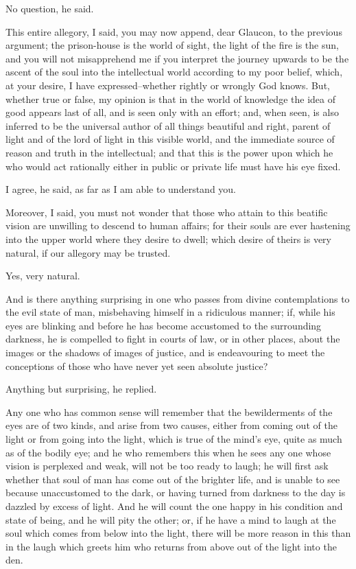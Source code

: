 No question, he said.

This entire allegory, I said, you may now append, dear Glaucon, to the
previous argument; the prison-house is the world of sight, the light of
the fire is the sun, and you will not misapprehend me if you interpret
the journey upwards to be the ascent of the soul into the intellectual
world according to my poor belief, which, at your desire, I have
expressed--whether rightly or wrongly God knows. But, whether true or
false, my opinion is that in the world of knowledge the idea of good
appears last of all, and is seen only with an effort; and, when seen,
is also inferred to be the universal author of all things beautiful and
right, parent of light and of the lord of light in this visible world,
and the immediate source of reason and truth in the intellectual; and
that this is the power upon which he who would act rationally either in
public or private life must have his eye fixed.

I agree, he said, as far as I am able to understand you.

Moreover, I said, you must not wonder that those who attain to this
beatific vision are unwilling to descend to human affairs; for their
souls are ever hastening into the upper world where they desire to
dwell; which desire of theirs is very natural, if our allegory may be
trusted.

Yes, very natural.

And is there anything surprising in one who passes from divine
contemplations to the evil state of man, misbehaving himself in a
ridiculous manner; if, while his eyes are blinking and before he has
become accustomed to the surrounding darkness, he is compelled to fight
in courts of law, or in other places, about the images or the shadows of
images of justice, and is endeavouring to meet the conceptions of those
who have never yet seen absolute justice?

Anything but surprising, he replied.

Any one who has common sense will remember that the bewilderments of the
eyes are of two kinds, and arise from two causes, either from coming out
of the light or from going into the light, which is true of the mind's
eye, quite as much as of the bodily eye; and he who remembers this when
he sees any one whose vision is perplexed and weak, will not be too
ready to laugh; he will first ask whether that soul of man has come out
of the brighter life, and is unable to see because unaccustomed to the
dark, or having turned from darkness to the day is dazzled by excess
of light. And he will count the one happy in his condition and state of
being, and he will pity the other; or, if he have a mind to laugh at the
soul which comes from below into the light, there will be more reason
in this than in the laugh which greets him who returns from above out of
the light into the den.

